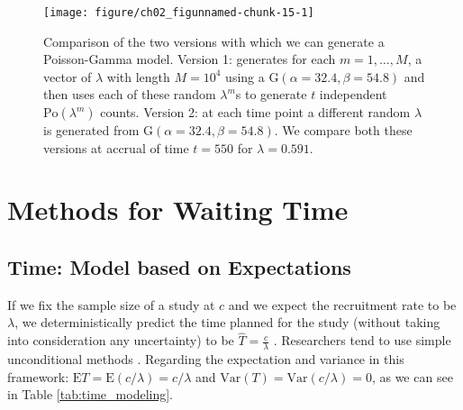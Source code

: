 \begin{figure}
\begin{knitrout}
\color{fgcolor}

{\centering \texttt{[image: figure/ch02\_figunnamed-chunk-15-1]} 

}


\end{knitrout}
  \caption{Comparison of the two versions with which we can generate a Poisson-Gamma model. Version 1: generates for each $m=1, \ldots, M$, a vector of $\lambda$ with length $M=10^4$ using a $\textrm{G}(\alpha = 32.4, \beta = 54.8)$ and then uses each of these random $\lambda^m$s to generate $t$ independent $\textrm{Po}(\lambda^m)$ counts. Version 2: at each time point a different random $\lambda$ is generated from $\textrm{G}(\alpha = 32.4, \beta = 54.8)$. We compare both these versions at accrual of time $t=550$ for $\lambda=0.591$.}
  \label{fig:2_12}
\end{figure}



\chapter{Methods for Waiting Time} 
\section{Time: Model based on Expectations}

If we fix the sample size of a study at $c$ and we expect the recruitment rate to be $\lambda$, we deterministically predict the time planned for the study (without taking into consideration any uncertainty) to be $\hat{T}=\frac{c}{\lambda}$ \citep{bagiella2001predicting}. Researchers tend to use simple unconditional methods \citep{white2015projection}. Regarding the expectation and variance in this framework: $\textrm{E}T = \textrm{E}(c/\lambda) = c/\lambda$ and $\textrm{Var}(T) = \textrm{Var}(c/\lambda) = 0$, as we can see in Table \ref{tab:time_modeling}.


\begin{table}[h!]
\centering
{}
\caption{Moments and aleatory and epistemic uncertainty of recruitment covered by different models for time having a fixed sample size $c$.}
\label{tab:time_modeling}
\end{table}

